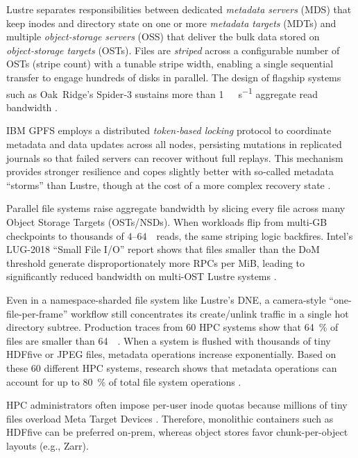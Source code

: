 \documentclass[nomenclature, english, bibtex]{kththesis}
\numberwithin{listing}{chapter}
\begin{document}
Lustre separates responsibilities between dedicated \emph{metadata servers} (\gls{MDS}) that keep inodes and directory state on one or more \emph{metadata targets} (MDTs) and multiple \emph{object‑storage servers} (\gls{OSS}) that deliver the bulk data stored on \emph{object‑storage targets} (\gls{OST}s).  Files are \emph{striped} across a configurable number of \gls{OST}s (stripe count) with a tunable stripe width, enabling a single sequential transfer to engage hundreds of disks in parallel. The design of flagship systems such as Oak Ridge’s Spider‐3 sustains more than \SI{1}{\tera\byte\per\second} aggregate read bandwidth \cite{braam2019lustre, oral2013olcf}.

IBM \gls{GPFS} employs a distributed \emph{token‑based locking} protocol to coordinate metadata and data updates across all nodes, persisting mutations in replicated journals so that failed servers can recover without full replays. This mechanism provides stronger resilience and copes slightly better with so‑called metadata “storms” than Lustre, though at the cost of a more complex recovery state \cite{schmuck2002gpfs}.

Parallel file systems raise aggregate bandwidth by slicing every file across many Object Storage Targets (\gls{OST}s/\gls{NSD}s). When workloads flip from multi-GB checkpoints to thousands of $4$–$64$\,\si{\kilo\byte} reads, the same striping logic backfires. Intel’s LUG-2018 “Small File I/O” report shows that files smaller than the \gls{DoM} threshold generate disproportionately more RPCs per MiB, leading to significantly reduced bandwidth on multi-\gls{OST} Lustre systems \cite{gmitter2018smallfile}.

Even in a namespace-sharded file system like Lustre’s \gls{DNE}, a camera-style “one-file-per-frame” workflow still concentrates its create/unlink traffic in a single hot directory subtree. Production traces from 60 \gls{HPC} systems show that \SI{64}{\percent} of files are smaller than \SI{64}{\kilo\byte}. When a system is flushed with thousands of tiny \gls{HDFfive} or JPEG files, metadata operations increase exponentially. Based on these 60 different \gls{HPC} systems, research shows that metadata operations can account for up to \SI{80}{\percent} of total file system operations \cite{9768784}.

\Gls{HPC} administrators often impose per-user inode quotas because millions of tiny files overload Meta Target Devices \cite{carns2009small}. Therefore, monolithic containers such as \gls{HDFfive} can be preferred on-prem, whereas object stores favor chunk-per-object layouts (e.g., Zarr).
\end{document}
